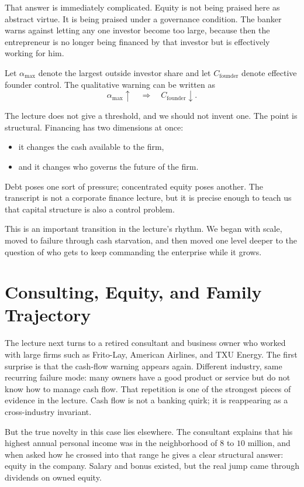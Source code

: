 That answer is immediately complicated. Equity is not being praised here as abstract virtue. It is being praised under a governance condition. The banker warns against letting any one investor become too large, because then the entrepreneur is no longer being financed by that investor but is effectively working for him.

Let \(\alpha_{\max}\) denote the largest outside investor share and let \(C_{\mathrm{founder}}\) denote effective founder control. The qualitative warning can be written as
\begin{equation}
\alpha_{\max} \uparrow \quad \Longrightarrow \quad C_{\mathrm{founder}} \downarrow.
\end{equation}

The lecture does not give a threshold, and we should not invent one. The point is structural. Financing has two dimensions at once:
\begin{itemize}
\item it changes the cash available to the firm,
\item and it changes who governs the future of the firm.
\end{itemize}
Debt poses one sort of pressure; concentrated equity poses another. The transcript is not a corporate finance lecture, but it is precise enough to teach us that capital structure is also a control problem.

This is an important transition in the lecture's rhythm. We began with scale, moved to failure through cash starvation, and then moved one level deeper to the question of who gets to keep commanding the enterprise while it grows.

\section{Consulting, Equity, and Family Trajectory}

The lecture next turns to a retired consultant and business owner who worked with large firms such as Frito-Lay, American Airlines, and TXU Energy. The first surprise is that the cash-flow warning appears again. Different industry, same recurring failure mode: many owners have a good product or service but do not know how to manage cash flow. That repetition is one of the strongest pieces of evidence in the lecture. Cash flow is not a banking quirk; it is reappearing as a cross-industry invariant.

But the true novelty in this case lies elsewhere. The consultant explains that his highest annual personal income was in the neighborhood of \(8\) to \(10\) million, and when asked how he crossed into that range he gives a clear structural answer: equity in the company. Salary and bonus existed, but the real jump came through dividends on owned equity.


